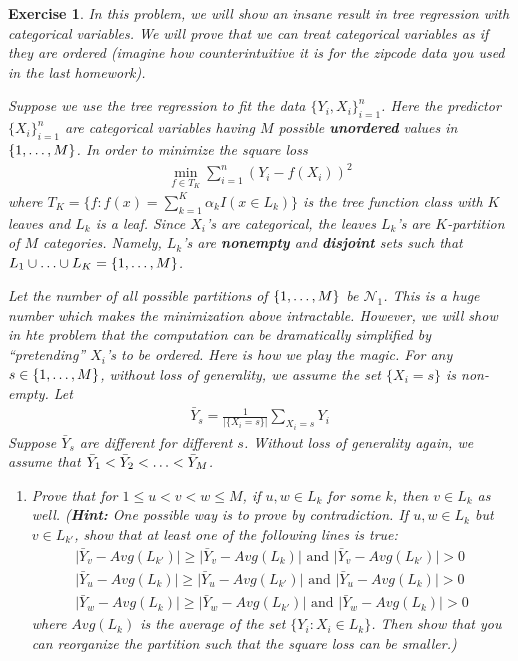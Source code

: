 \documentclass[12pt]{article}
\theoremstyle{colon}
\newtheorem{exercise}{Exercise}
\begin{document}
\begin{exercise}
  In this problem, we will show an insane result in tree regression with categorical variables. We will prove that we can treat categorical variables as if they are ordered (imagine how counterintuitive it is for the zipcode data you used in the last homework).

  Suppose we use the tree regression to fit the data $\{Y_i, X_i\}_{i=1}^n$. Here the predictor $\{X_i\}_{i=1}^n$ are categorical variables having $M$ possible \textbf{unordered} values in $\{1,\mathellipsis,M\}$. In order to minimize the square loss
  \begin{gather*}
    \min_{f \in T_K} \sum_{i=1}^n (Y_i - f(X_i))^2
  \end{gather*}
  where $T_K = \{ f : f(x) = \sum_{k=1}^K \alpha_k I(x \in L_k) \}$ is the tree function class with $K$ leaves and $L_k$ is a leaf. Since $X_i$'s are categorical, the leaves $L_k$'s are $K$-partition of $M$ categories. Namely, $L_k$'s are \textbf{nonempty} and \textbf{disjoint} sets such that $L_1 \cup \mathellipsis \cup L_K = \{1,\mathellipsis,M\}$.

  Let the number of all possible partitions of $\{1,\mathellipsis,M\}$ be $\mathcal{N}_1$. This is a huge number which makes the minimization above intractable. However, we will show in hte problem that the computation can be dramatically simplified by ``pretending'' $X_i$'s to be ordered. Here is how we play the magic. For any $s \in \{1,\mathellipsis,M\}$, without loss of generality, we assume the set $\{X_i = s\}$ is non-empty. Let
  \begin{gather*}
    \bar{Y}_s = \frac{1}{\lvert \{X_i = s\} \rvert} \sum_{X_i = s} Y_i
  \end{gather*}
  Suppose $\bar{Y}_s$ are different for different $s$. Without loss of generality again, we assume that $\bar{Y}_1 < \bar{Y}_2 < \mathellipsis < \bar{Y}_M$.
  \begin{enumerate}[label=\arabic*)]
    \item Prove that for $1 \leq u < v < w \leq M$, if $u,w \in L_k$ for some $k$, then $v \in L_k$ as well.
      (\textbf{Hint:} One possible way is to prove by contradiction. If $u,w \in L_k$ but $v \in L_{k'}$, show that at least one of the following lines is true:
      \begin{gather*}
        \lvert \bar{Y}_v - Avg(L_{k'}) \rvert \geq \lvert \bar{Y}_v - Avg(L_{k}) \rvert \text{ and } \lvert \bar{Y}_v - Avg(L_{k'}) \rvert > 0 \\
        \lvert \bar{Y}_u - Avg(L_k) \rvert \geq \lvert \bar{Y}_u - Avg(L_{k'}) \rvert \text{ and } \lvert \bar{Y}_u - Avg(L_k) \rvert > 0 \\
        \lvert \bar{Y}_w - Avg(L_k) \rvert \geq \lvert \bar{Y}_w - Avg(L_{k'}) \rvert \text{ and } \lvert \bar{Y}_w - Avg(L_k) \rvert > 0
      \end{gather*}
      where $Avg(L_k)$ is the average of the set $\{Y_i : X_i \in L_k\}$. Then show that you can reorganize the partition such that the square loss can be smaller.)


\end{enumerate}
\end{exercise}
\end{document}

